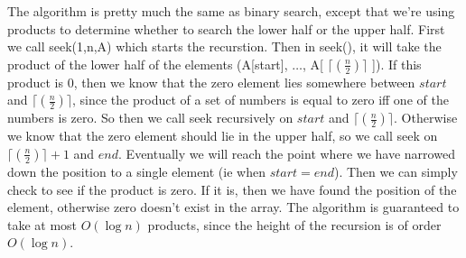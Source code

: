 \documentclass{article}[12pt]
\begin{document}
    The algorithm is pretty much the same as binary search, except that we're using products to determine whether to search the lower half or the upper half. First we call seek(1,n,A) which starts the recurstion. Then in seek(), it will take the product of the lower half of the elements (A[start], $\ldots$, A[ $\lceil(\frac{n}{2})\rceil$ ]). If this product is 0, then we know that the zero element lies somewhere between $start$ and $\lceil(\frac{n}{2})\rceil$, since the product of a set of numbers is equal to zero iff one of the numbers is zero. So then we call seek recursively on $start$ and $\lceil(\frac{n}{2})\rceil$. Otherwise we know that the zero element should lie in the upper half, so we call seek on $\lceil(\frac{n}{2})\rceil+1$ and $end$. Eventually we will reach the point where we have narrowed down the position to a single element (ie when $start = end$). Then we can simply check to see if the product is zero. If it is, then we have found the position of the element, otherwise zero doesn't exist in the array. The algorithm is guaranteed to take at most $O(\log n)$ products, since the height of the recursion is of order $O(\log n)$. 
      
\end{document}

